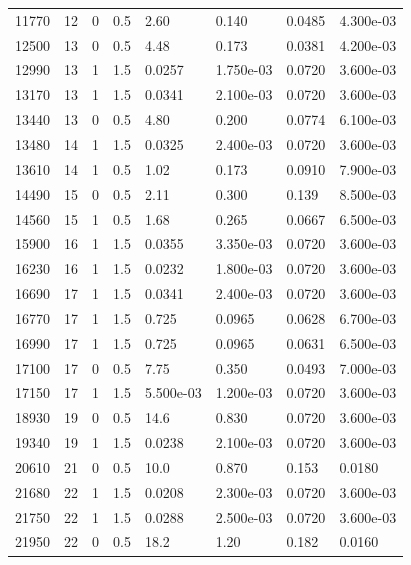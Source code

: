 \documentclass[preview]{standalone}
\begin{document}
{{{\begin{tabular}{L{1.2cm}C{1.2cm} C{0.3cm}C{0.5cm} C{1.4cm}C{1.4cm} C{1.4cm}C{1.4cm}}
  11770  &    12  & 0     & 0.5 &  2.60  & 0.140  & 0.0485 &  4.300e-03   \\ 
  12500  &    13  & 0     & 0.5 &  4.48  & 0.173  & 0.0381 &  4.200e-03   \\ 
  12990  &    13  & 1     & 1.5 &  0.0257  & 1.750e-03  & 0.0720 &  3.600e-03   \\ 
  13170  &    13  & 1     & 1.5 &  0.0341  & 2.100e-03  & 0.0720 &  3.600e-03   \\ 
  13440  &    13  & 0     & 0.5 &  4.80  & 0.200  & 0.0774 &  6.100e-03   \\ 
  13480  &    14  & 1     & 1.5 &  0.0325  & 2.400e-03  & 0.0720 &  3.600e-03   \\ 
  13610  &    14  & 1     & 0.5 &  1.02  & 0.173  & 0.0910 &  7.900e-03   \\ 
  14490  &    15  & 0     & 0.5 &  2.11  & 0.300  & 0.139 &  8.500e-03   \\ 
  14560  &    15  & 1     & 0.5 &  1.68  & 0.265  & 0.0667 &  6.500e-03   \\ 
  15900  &    16  & 1     & 1.5 &  0.0355  & 3.350e-03  & 0.0720 &  3.600e-03   \\ 
  16230  &    16  & 1     & 1.5 &  0.0232  & 1.800e-03  & 0.0720 &  3.600e-03   \\ 
  16690  &    17  & 1     & 1.5 &  0.0341  & 2.400e-03  & 0.0720 &  3.600e-03   \\ 
  16770  &    17  & 1     & 1.5 &  0.725  & 0.0965  & 0.0628 &  6.700e-03   \\ 
  16990  &    17  & 1     & 1.5 &  0.725  & 0.0965  & 0.0631 &  6.500e-03   \\ 
  17100  &    17  & 0     & 0.5 &  7.75  & 0.350  & 0.0493 &  7.000e-03   \\ 
  17150  &    17  & 1     & 1.5 &  5.500e-03  & 1.200e-03  & 0.0720 &  3.600e-03   \\ 
  18930  &    19  & 0     & 0.5 &  14.6  & 0.830  & 0.0720 &  3.600e-03   \\ 
  19340  &    19  & 1     & 1.5 &  0.0238  & 2.100e-03  & 0.0720 &  3.600e-03   \\ 
  20610  &    21  & 0     & 0.5 &  10.0  & 0.870  & 0.153 &  0.0180   \\ 
  21680  &    22  & 1     & 1.5 &  0.0208  & 2.300e-03  & 0.0720 &  3.600e-03   \\ 
  21750  &    22  & 1     & 1.5 &  0.0288  & 2.500e-03  & 0.0720 &  3.600e-03   \\ 
  21950  &    22  & 0     & 0.5 &  18.2  & 1.20  & 0.182 &  0.0160   \\ 

\end{tabular}}}}
\end{document}
